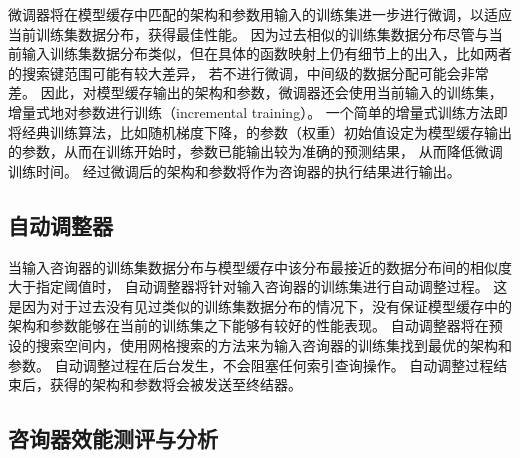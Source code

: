微调器将在模型缓存中匹配的{\rmi}架构和参数用输入的训练集进一步进行微调，以适应当前训练集数据分布，获得最佳性能。
因为过去相似的训练集数据分布尽管与当前输入训练集数据分布类似，但在具体的函数映射上仍有细节上的出入，比如两者的搜索键范围可能有较大差异，
若不进行微调，{\rmi}中间级{\model}的数据分配可能会非常差。
因此，对模型缓存输出的{\rmi}架构和参数，微调器还会使用当前输入的训练集，增量式地对{\model}参数进行训练（incremental training）。
一个简单的增量式训练方法即将经典训练算法，比如随机梯度下降，的参数（权重）初始值设定为模型缓存输出的参数，从而在训练开始时，参数已能输出较为准确的预测结果，
从而降低微调训练时间。
经过微调后的{\rmi}架构和参数将作为咨询器的执行结果进行输出。


\subsection{自动调整器}

当输入咨询器的训练集数据分布与模型缓存中该分布最接近的数据分布间的相似度大于指定阈值时，
自动调整器将针对输入咨询器的训练集进行自动调整过程。
这是因为对于过去没有见过类似的训练集数据分布的情况下，没有保证模型缓存中的{\rmi}架构和参数能够在当前的训练集之下能够有较好的性能表现。
自动调整器将在预设的搜索空间内，使用网格搜索的方法来为输入咨询器的训练集找到最优的{\rmi}架构和参数。
自动调整过程在后台发生，不会阻塞任何索引查询操作。
自动调整过程结束后，获得的{\rmi}架构和参数将会被发送至终结器。


\subsection{咨询器效能测评与分析}

